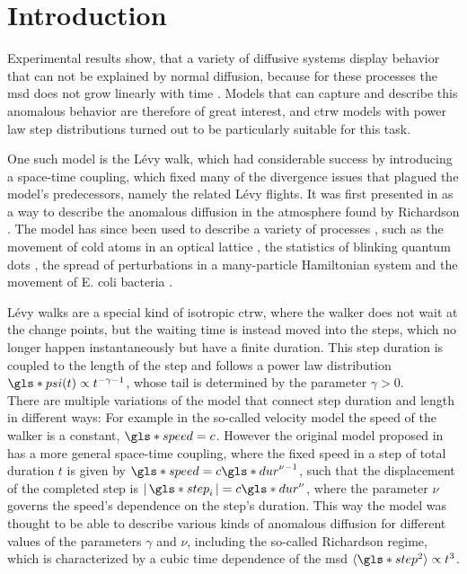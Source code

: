 \chapter{Introduction}

Experimental results show, that a variety of diffusive systems display behavior that can not be explained by normal diffusion, because for these processes the \gls*{msd} does not grow linearly with time
\cite{xu2011,sagi2012,marty2005,amblard1996}
. 
Models that can capture and describe this anomalous behavior are therefore of great interest, and \gls*{ctrw} models with power law step distributions turned out to be particularly suitable for this task.

One such model is the L\'evy walk, which had considerable success by introducing a space-time coupling, which fixed many of the divergence issues that plagued the model's predecessors, namely the related L\'evy flights. It was first presented in 
\cite{shlesinger1987} 
as a way to describe the anomalous diffusion in the atmosphere found by Richardson 
\cite{richardson}. 
The model has since been used to describe a variety of processes 
\cite{lwreview} ,
such as the movement of cold atoms in an optical lattice 
\cite{marksteiner1996}, 
the statistics of blinking quantum dots 
\cite{jung2002}, 
the spread of perturbations in a many-particle Hamiltonian system 
\cite{zaburdaev2011perturbation} 
and the movement of E. coli bacteria 
\cite{korobkova2004}.

L\'evy walks are a special kind of isotropic \gls*{ctrw}, where the walker does not wait at the change points, but the waiting time is instead moved into the steps, which no longer happen instantaneously but have a finite duration. This step duration is coupled to the length of the step and follows a power law distribution $\gls*{psi}(t) \propto t^{-\gamma-1}$, whose tail is determined by the parameter $\gamma>0$. \\
There are multiple variations of the model that connect step duration and length in different ways: For example in the so-called velocity model the speed of the walker is a constant, $\gls*{speed} = c$. However the original model proposed in 
\cite{shlesinger1987}
has a more general space-time coupling, where the fixed speed in a step of total duration $t$ is given by $\gls*{speed} = c  \gls*{dur}^{\nu-1}$, such that the displacement of the completed step is $\abs{\gls*{step}_i} = c \gls*{dur}^{\nu}$, where the parameter $\nu$ governs the speed's dependence on the step's duration. This way the model was thought to be able to describe various kinds of anomalous diffusion for different values of the parameters $\gamma$ and $\nu$, including the so-called Richardson regime, which is characterized by a cubic time dependence of the \gls*{msd} $\mean{\gls*{step}^2} \propto t^3$. 

